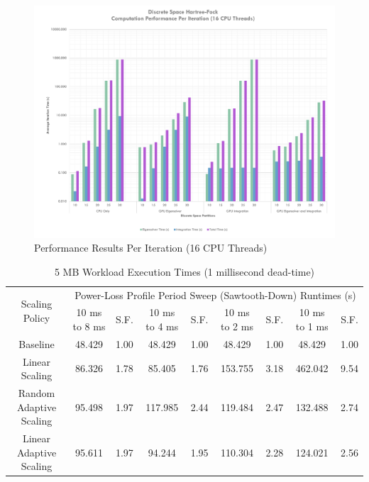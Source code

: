 \documentclass[journal, twoside]{IEEEtran}
\begin{document}
\begin{figure}[ht]
\centering
\includegraphics[width=7in]{figures/sixteen-core-results.pdf}
\caption{Performance Results Per Iteration (16 CPU Threads)}
\label{perf-results-per-iteration-sixteen-core}
\end{figure}


\begin{table}
    \renewcommand{\arraystretch}{1.3} %
    \caption{5 MB Workload Execution Times (1 millisecond dead-time)}
    \label{main-workload-results-1ms}
    \centering
    \begin{tabular}{c||c|c|c|c|c|c|c|c}
        \hline
        \multirow{2}{*}{Scaling Policy} & \multicolumn{8}{c}{Power-Loss Profile Period Sweep (Sawtooth-Down) Runtimes (s)} \\\cline{2-9}
        {} & {10 ms to 8 ms} & {S.F.} & {10 ms to 4 ms} & {S.F.} & {10 ms to 2 ms} & {S.F.} & {10 ms to 1 ms} & {S.F.} \\
        \hline
        \hline
        {Baseline}                  & {48.429} & {1.00} & {48.429}  & {1.00} & {48.429}  & {1.00} & {48.429}  & {1.00}\\
        {Linear Scaling}            & {86.326} & {1.78} & {85.405}  & {1.76} & {153.755} & {3.18} & {462.042} & {9.54}\\
        {Random Adaptive Scaling}   & {95.498} & {1.97} & {117.985} & {2.44} & {119.484} & {2.47} & {132.488} & {2.74}\\
        {Linear Adaptive Scaling}   & {95.611} & {1.97} & {94.244}  & {1.95} & {110.304} & {2.28} & {124.021} & {2.56}\\
        \hline
    \end{tabular}
\end{table}
\end{document}
